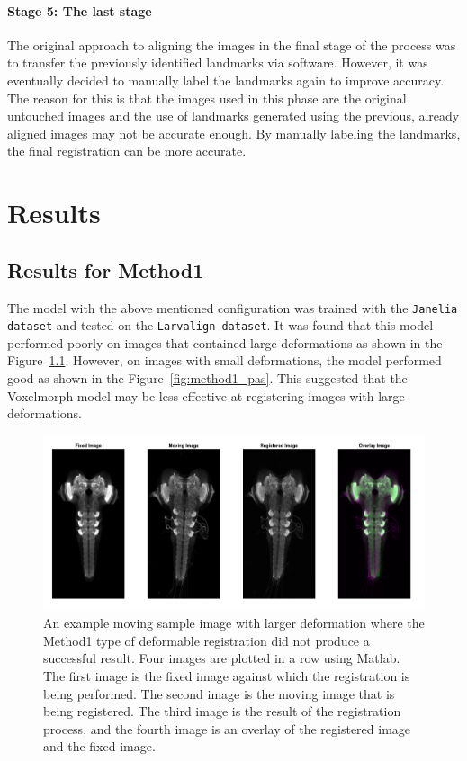 \documentclass{report}
\begin{document}
	\subsubsection{Stage 5: The last stage}
	The original approach to aligning the images in the final stage of the process was to transfer the previously identified landmarks via software. However, it was eventually decided to manually label the landmarks again to improve accuracy. The reason for this is that the images used in this phase are the original untouched images and the use of landmarks generated using the previous, already aligned images may not be accurate enough. By manually labeling the landmarks, the final registration can be more accurate.
	
	\chapter{Results}
	
	\section{Results for Method1}
	The model with the above mentioned configuration was trained with the \texttt{Janelia dataset} and tested on the \texttt{Larvalign dataset}. It was found that this model performed poorly on images that contained large deformations as shown in the Figure~\ref{fig:method1_fail}. However, on images with small deformations, the model performed good as shown in the Figure~\ref{fig:method1_pas}. This suggested that the Voxelmorph model may be less effective at registering images with large deformations.
	
	\begin{figure}[h!]
		\centering
		\includegraphics[width=0.9\columnwidth]{resources/chapter4/np_60H12_14E09_MB049B_020113B_scaled.tif.png}
		\caption{An example moving sample image with larger deformation where the Method1 type of deformable registration did not produce a successful result. Four images are plotted in a row using Matlab. The first image is the fixed image against which the registration is being performed. The second image is the moving image that is being registered. The third image is the result of the registration process, and the fourth image is an overlay of the registered image and the fixed image.}
		\label{fig:method1_fail}
	\end{figure}
	
\end{document}
